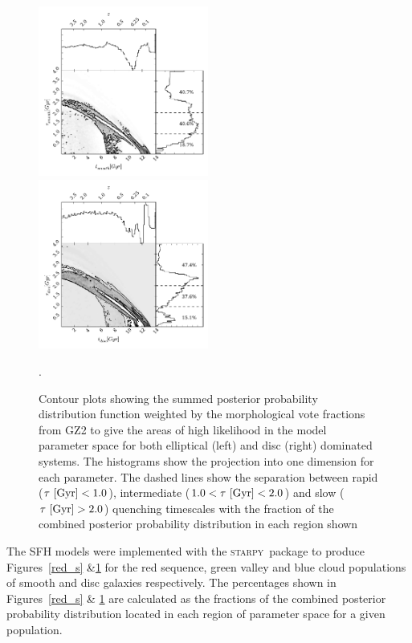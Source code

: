 \documentclass[useAMS,usenatbib]{mn2e}
\def\starpy {\textsc{starpy}}
\begin{document}
\begin{figure}
\includegraphics[width=0.4975\textwidth]{green_smooth.pdf}
\includegraphics[width=0.4975\textwidth]{green_disc.pdf}
\caption{Contour plots showing the summed posterior probability distribution function weighted by the morphological vote fractions from GZ2 to give the areas of high likelihood in the model parameter space for both elliptical (left) and disc (right) dominated systems. The histograms show the projection into one dimension for each parameter. The dashed lines show the separation between rapid ($\tau ~\rm{[Gyr]} < 1.0$), intermediate ($1.0 < \tau ~\rm{[Gyr]} < 2.0$) and slow ($\tau ~\rm{[Gyr]} > 2.0$) quenching timescales with the fraction of the combined posterior probability distribution in each region shown}.

\label{green_v}
\end{figure}

The SFH models were implemented with the \starpy ~package to produce Figures~\ref{red_s} \&\ref{green_v} for the red sequence, green valley and blue cloud populations of smooth and disc galaxies respectively. The percentages shown in Figures~\ref{red_s} \& \ref{green_v} are calculated as the fractions of the combined posterior probability distribution located in each region of parameter space for a given population. 
\end{document}
